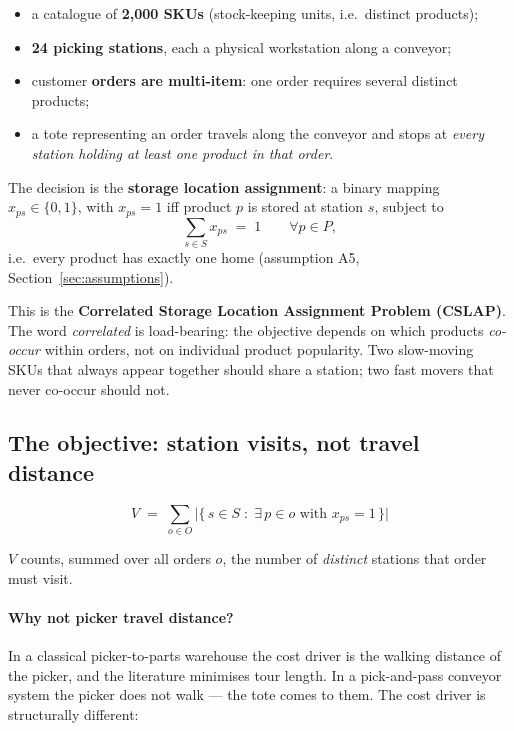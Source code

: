 \documentclass[11pt,a4paper]{article}
\begin{document}
\begin{itemize}
  \item a catalogue of \textbf{2{,}000 SKUs} (stock-keeping units, i.e.\ distinct products);
  \item \textbf{24 picking stations}, each a physical workstation along a conveyor;
  \item customer \textbf{orders are multi-item}: one order requires several distinct products;
  \item a tote representing an order travels along the conveyor and stops at
        \emph{every station holding at least one product in that order}.
\end{itemize}

The decision is the \textbf{storage location assignment}: a binary mapping
$x_{ps}\in\{0,1\}$, with $x_{ps}=1$ iff product $p$ is stored at station $s$,
subject to
\[
  \sum_{s\in S} x_{ps} \;=\; 1 \qquad \forall p \in P,
\]
i.e.\ every product has exactly one home (assumption A5, Section~\ref{sec:assumptions}).

This is the \textbf{Correlated Storage Location Assignment Problem (CSLAP)}.
The word \emph{correlated} is load-bearing: the objective depends on which
products \emph{co-occur} within orders, not on individual product popularity.
Two slow-moving SKUs that always appear together should share a station; two
fast movers that never co-occur should not.

\subsection{The objective: station visits, not travel distance}

\begin{equation}
  V \;=\; \sum_{o\in O}\bigl|\{\, s\in S \;:\; \exists\, p\in o \text{ with } x_{ps}=1 \,\}\bigr|
  \label{eq:objective}
\end{equation}

$V$ counts, summed over all orders $o$, the number of \emph{distinct} stations
that order must visit.

\paragraph{Why not picker travel distance?}
In a classical picker-to-parts warehouse the cost driver is the walking
distance of the picker, and the literature minimises tour length. In a
pick-and-pass conveyor system the picker does not walk --- the tote comes to
them. The cost driver is structurally different:
\end{document}
